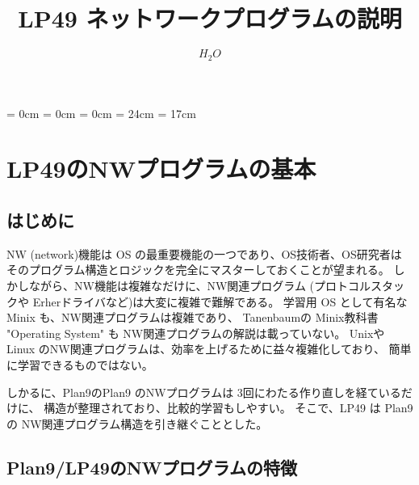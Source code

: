 


\topmargin = 0cm
\oddsidemargin = 0cm
\evensidemargin = 0cm
\textheight = 24cm
\textwidth = 17cm

\setcounter{secnumdepth}{2}



\title{\huge\bf
LP49 ネットワークプログラムの説明
}

\author{$H_2O$}



\maketitle

\tableofcontents

\chapter{LP49のNWプログラムの基本}
   
\section{はじめに}

      NW (network)機能は OS の最重要機能の一つであり、OS技術者、OS研究者は
      そのプログラム構造とロジックを完全にマスターしておくことが望まれる。
      しかしながら、NW機能は複雑なだけに、NW関連プログラム (プロトコルスタックや  
      Erherドライバなど)は大変に複雑で難解である。
      学習用 OS として有名な Minix も、NW関連プログラムは複雑であり、
      Tanenbaumの Minix教科書 "Operating System" も NW関連プログラムの解説は載っていない。
      Unixや Linux のNW関連プログラムは、効率を上げるために益々複雑化しており、
      簡単に学習できるものではない。
    
      しかるに、Plan9のPlan9 のNWプログラムは 3回にわたる作り直しを経ているだけに、
      構造が整理されており、比較的学習もしやすい。
      そこで、LP49 は Plan9 の NW関連プログラム構造を引き継ぐこととした。


\section{Plan9/LP49のNWプログラムの特徴}

